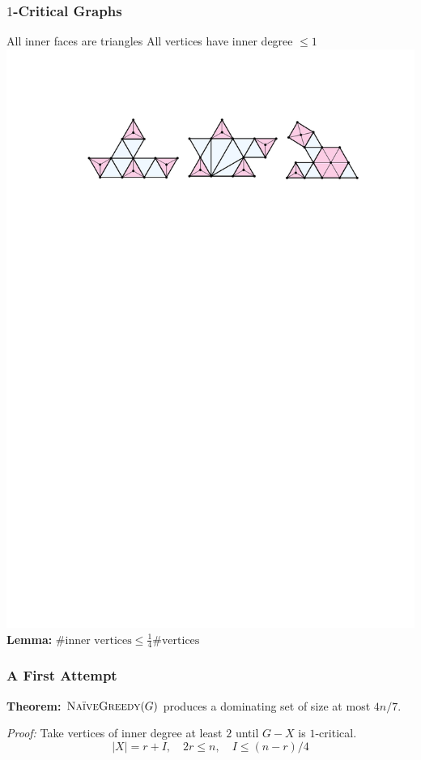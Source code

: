 \documentclass{beamer}
\begin{document}
\begin{frame}
  \frametitle{$1$-Critical Graphs}

  All inner faces are triangles \newline
  All vertices have inner degree $\le 1$ \\[3em]

  \includegraphics[width=.98\textwidth]{figs/critical}\\[3em]

  \textbf{Lemma:} $\text{\#inner vertices} \le \tfrac{1}{4}\text{\#vertices}$
\end{frame}

\begin{frame}
  \frametitle{A First Attempt}

  \textbf{Theorem:} $\textsc{NaïveGreedy}(G)$ produces a dominating set of size at most $4n/7$.

  \textit{Proof:} Take vertices of inner degree at least $2$ until $G-X$ is $1$-critical.
  \[
     |X| = r + I , \quad 2r \le n, \quad I \le (n-r)/4
  \]
\end{frame}
\end{document}
